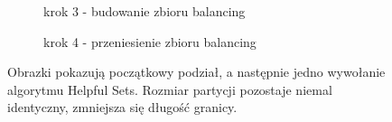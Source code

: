 \begin{figure}[h]
\begin{subfigure}{.5\textwidth}
    \centering
    \caption[short]{krok 3 - budowanie zbioru balancing}
\end{subfigure}
\begin{subfigure}{.5\textwidth}
    \centering
    \caption[short]{krok 4 - przeniesienie zbioru balancing}
\end{subfigure}%
\caption{Obrazki pokazują początkowy podział, a następnie jedno wywołanie algorytmu Helpful Sets. Rozmiar partycji pozostaje
niemal identyczny, zmniejsza się długość granicy.}
\label{im:balancing}
\end{figure}

